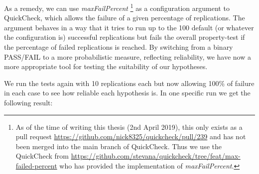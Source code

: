 As a remedy, we can use \textit{maxFailPercent} \footnote{As of the time of writing this thesis (2nd April 2019), this only exists as a pull request \url{https://github.com/nick8325/quickcheck/pull/239} and has not been merged into the main branch of QuickCheck. Thus we use the QuickCheck from \url{https://github.com/stevana/quickcheck/tree/feat/max-failed-percent} who has provided the implementation of \textit{maxFailPercent}.} as a configuration argument to QuickCheck, which allows the failure of a given percentage of replications. The argument behaves in a way that it tries to run up to the 100 default (or whatever the configuration is) successful replications but fails the overall property-test if the percentage of failed replications is reached. By switching from a binary PASS/FAIL to a more probabilistic measure, reflecting reliability, we have now a more appropriate tool for testing the suitability of our hypotheses. 

We run the tests again with 10 replications each but now allowing 100\% of failure in each case to see how reliable each hypothesis is. In one specific run we get the following result:

%
%
%
%
%
%
%
%

